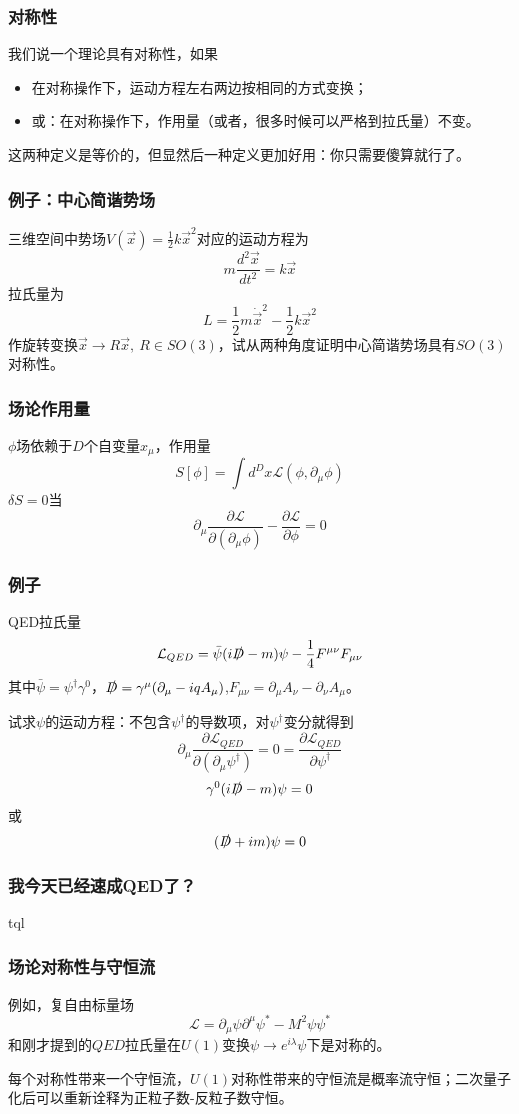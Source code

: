 \documentclass[CJK]{beamer}
\begin{document}
\begin{frame}
\frametitle{\bch 对称性 \ech}
\bch
我们说一个理论具有对称性，如果
\begin{itemize}
\item 在对称操作下，运动方程左右两边按相同的方式变换；
\item 或：在对称操作下，作用量（或者，很多时候可以严格到拉氏量）不变。
\end{itemize}
这两种定义是等价的，但显然后一种定义更加好用：你只需要傻算就行了。
\ech
\end{frame}

\begin{frame}
\frametitle{\bch 例子：中心简谐势场 \ech}
\bch
三维空间中势场$V(\vec x ) = \frac{1}{2}k \vec x^2$对应的运动方程为
$$
m \frac{d^2 \vec x}{dt^2} = k \vec x
$$
拉氏量为
$$
L = \frac{1}{2} m \dot{\vec x}^2 - \frac{1}{2}k \vec x^2
$$
作旋转变换$\vec x \to R \vec x,\ R \in SO(3)$，试从两种角度证明中心简谐势场具有$SO(3)$对称性。
\ech
\end{frame}

\begin{frame}
\frametitle{\bch 场论作用量 \ech}
\bch
$\phi$场依赖于$D$个自变量$x_\mu$，作用量
$$S[\phi] = \int d^D x \mathcal{L} (\phi,\partial_\mu \phi)$$
$\delta S = 0$当$$\partial_\mu \frac{\partial \mathcal{L}}{\partial (\partial_\mu \phi)} - \frac{\partial \mathcal{L}}{\partial \phi} = 0$$

\ech
\end{frame}

\begin{frame}
\frametitle{\bch 例子 \ech}
\bch
QED拉氏量
$$
\mathcal{L}_{QED} = \bar{\psi} ( i \slashed{D} - m) \psi - \frac{1}{4} F^{\mu \nu} F_{\mu \nu}$$
其中$\bar{\psi} = \psi^\dagger \gamma^0$，$\slashed D = \gamma^\mu ( \partial_\mu - iq A_\mu)$,$F_{\mu \nu} = \partial_\mu A_\nu - \partial_\nu A_\mu$。
\par
试求$\psi$的运动方程：不包含$\psi^\dagger$的导数项，对$\psi^\dagger$变分就得到
$$
\partial_\mu \frac{\partial \mathcal{L}_{QED} }{\partial (\partial_\mu \psi^\dagger)} = 0 = \frac{\partial \mathcal{L}_{QED}}{\partial \psi^\dagger}$$
$$
\gamma^0 (i \slashed{D} - m) \psi = 0
$$
或
$$
(\slashed{D} + im) \psi =0
$$

\ech
\end{frame}

\begin{frame}
\frametitle{\bch 我今天已经速成QED了？ \ech}
\bch
{\Huge \centering tql}
\ech
\end{frame}

\begin{frame}
\frametitle{\bch 场论对称性与守恒流 \ech}
\bch
例如，复自由标量场
$$
\mathcal{L} = \partial_\mu \psi \partial^\mu \psi^* - M^2 \psi \psi^*
$$
和刚才提到的$QED$拉氏量在$U(1)$变换$\psi \to e^{i\lambda} \psi$下是对称的。
\par
每个对称性带来一个守恒流，$U(1)$对称性带来的守恒流是概率流守恒；二次量子化后可以重新诠释为正粒子数-反粒子数守恒。
\ech
\end{frame}
\end{document}
